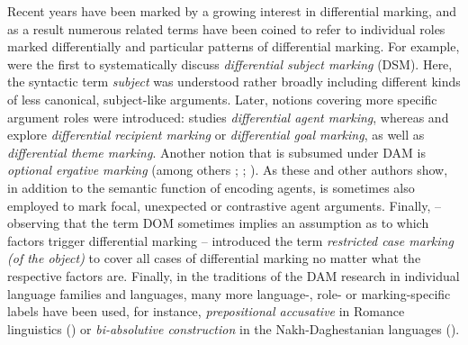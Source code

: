 \documentclass[output=paper]{LSP/langsci}
\begin{document}
Recent years have been marked by a growing interest in differential marking, and as a result numerous related terms have been coined to refer to individual roles marked differentially and particular patterns of differential marking. For example, 
\citet{deHoopetal2008Differential} were the first to systematically discuss \textit{differential subject marking} (DSM). 
Here, the syntactic term \textit{subject} was understood rather broadly including different kinds of less canonical, subject-like arguments. 
Later, notions covering more specific argument roles were introduced: \citet{Fauconnier2011Differential} studies \textit{differential agent marking}, whereas \citet{Haspelmath2007Ditransitive} and \citet{Kittila2008Animacy} explore \textit{differential recipient marking} or \textit{differential goal marking}, as well as \textit{differential theme marking}. 
Another notion that is subsumed under DAM is \textit{optional ergative marking} (\cf among others \citealt{McGregor1992Semantics, McGregor1998Optional, McGregor2006Focal, McGregor2010Optional}; \citealt{Meakins2009Case}; \citealt{Gaby2010Discourse}). 
As these and other authors show, in addition to the semantic function of encoding agents,  is sometimes also employed to mark focal, unexpected or contrastive agent arguments. 
Finally, \citet{Sinnemki2014Typological} – observing that the term DOM sometimes implies an assumption as to which factors trigger differential marking – introduced the term \textit{restricted case marking (of the object)} to cover all cases of differential marking no matter what the respective factors are. 
Finally, in the traditions of the DAM research in individual language families and languages, many more language-, role- or marking-specific labels have been used, for instance, \textit{prepositional accusative} in Romance linguistics (\eg \citealt{Torrego1999Gramatica}) or \textit{bi-absolutive construction} in the Nakh-Daghestanian languages (\eg \citealt{Forker2012Bi-absolutive}).
\end{document}
